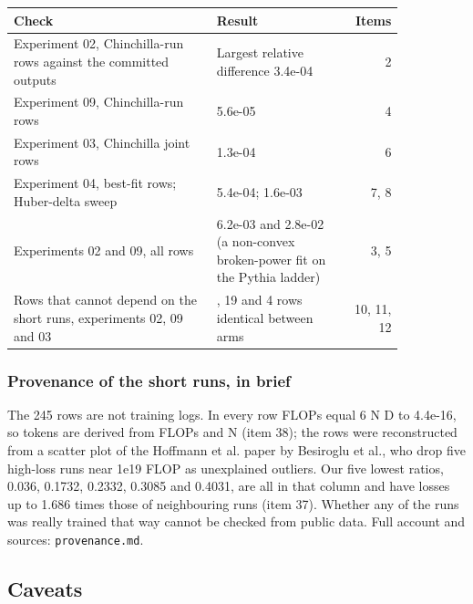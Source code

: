 {\footnotesize
\begin{longtable}{>{\raggedright\arraybackslash}p{0.521\linewidth}>{\raggedright\arraybackslash}p{0.329\linewidth}r}
\toprule
\textbf{Check} & \textbf{Result} & \textbf{Items} \\
\midrule
\endhead
\bottomrule
\endfoot
Experiment 02, Chinchilla-run rows against the committed outputs & Largest relative difference 3.4e-04 & 2 \\
Experiment 09, Chinchilla-run rows & 5.6e-05 & 4 \\
Experiment 03, Chinchilla joint rows & 1.3e-04 & 6 \\
Experiment 04, best-fit rows; Huber-delta sweep & 5.4e-04; 1.6e-03 & 7, 8 \\
Experiments 02 and 09, all rows & 6.2e-03 and 2.8e-02 (a non-convex broken-power fit on the Pythia ladder) & 3, 5 \\
Rows that cannot depend on the short runs, experiments 02, 09 and 03 & 24, 19 and 4 rows identical between arms & 10, 11, 12 \\
\end{longtable}
}

\subsubsection*{Provenance of the short runs, in brief}

The 245 rows are not training logs. In every row FLOPs equal 6 N D to 4.4e-16, so tokens are derived from FLOPs and N (item 38); the rows were reconstructed from a scatter plot of the Hoffmann et al. paper by Besiroglu et al., who drop five high-loss runs near 1e19 FLOP as unexplained outliers. Our five lowest ratios, 0.036, 0.1732, 0.2332, 0.3085 and 0.4031, are all in that column and have losses up to 1.686 times those of neighbouring runs (item 37). Whether any of the runs was really trained that way cannot be checked from public data. Full account and sources: \texttt{provenance.md}.


\subsection*{Caveats}

